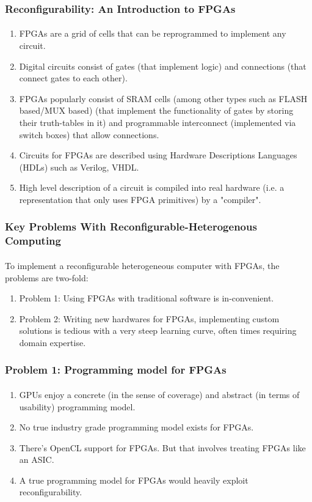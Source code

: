 \documentclass{beamer}
\begin{document}
{\begin{frame}[fragile]
\frametitle{Reconfigurability: An Introduction to FPGAs}
\framesubtitle{}
  \begin{enumerate}
    \item FPGAs are a grid of cells that can be reprogrammed to implement
      any circuit. 
    \item Digital circuits consist of gates (that implement logic) and
      connections (that connect gates to each other).
    \item FPGAs popularly consist of SRAM cells (among other types such as FLASH based/MUX
      based) (that implement the
      functionality of gates by storing their truth-tables in it) and
      programmable interconnect (implemented via switch boxes) that allow
      connections.
    \item Circuits for FPGAs are described using Hardware Descriptions Languages
      (HDLs) such as Verilog, VHDL.
    \item High level description of a circuit is compiled into real hardware
      (i.e. a representation that only uses FPGA primitives) by a "compiler".
  \end{enumerate}

\end{frame}

\begin{frame}[fragile]
\frametitle{Key Problems With Reconfigurable-Heterogenous Computing}
\framesubtitle{}
    To implement a reconfigurable heterogeneous computer with FPGAs,
      the problems are two-fold:
  \begin{enumerate}
    \item Problem 1: Using FPGAs with traditional software is in-convenient.
    \item Problem 2: Writing new hardwares for FPGAs, implementing custom solutions is
      tedious with a very steep learning curve, often times requiring 
      domain expertise.
  \end{enumerate}
\end{frame}

\begin{frame}[fragile]
\frametitle{Problem 1: Programming model for FPGAs}
\framesubtitle{}
  \begin{enumerate}
    \item GPUs enjoy a concrete (in the sense of coverage) and abstract (in
      terms of usability) programming model.
    \item No true industry grade programming model exists for FPGAs.
    \item There's OpenCL support for FPGAs. But that involves treating
      FPGAs like an ASIC.
    \item A true programming model for FPGAs would heavily exploit
      reconfigurability.
  \end{enumerate}
\end{frame}

}
\end{document}
